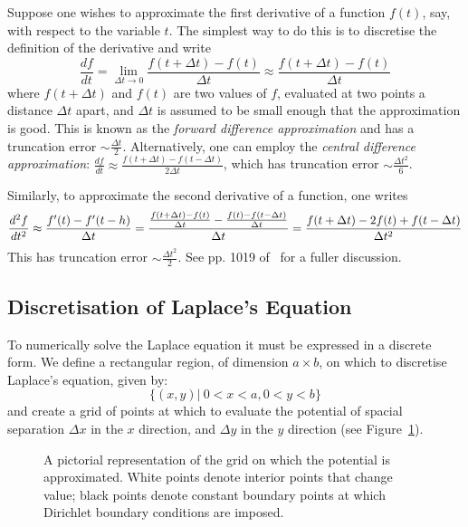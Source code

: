 \documentclass[11pt, a4paper]{article}
\newcommand{\be}{\begin{equation}}
\newcommand{\ee}{\end{equation}}
\begin{document}
Suppose one wishes to approximate the first derivative of a function $f(t)$, say,
with respect to the variable $t$. The simplest way to do this is to discretise the
definition of the derivative and write
%
\be
\frac{df}{dt} = \lim_{\Delta t \to 0} \frac{f(t+\Delta t) - f(t)}{\Delta t} \approx \frac{f(t+\Delta t) - f(t)}{\Delta t}
\ee
%
where $f(t+\Delta t)$ and $f(t)$ are two values of $f$, evaluated at two points
a distance $\Delta t$ apart, and $\Delta t$ is assumed to be small enough that
the approximation is good. This is known as the \emph{forward difference approximation}
and has a truncation error $\sim \frac{\Delta t}{2}$.
Alternatively, one can employ the \emph{central difference approximation}:
$\frac{df}{dt}\approx \frac{f(t+\Delta t) - f(t-\Delta t)}{2 \Delta t}$, which has
truncation error $\sim \frac{\Delta t^2}{6}$.

Similarly, to approximate the second derivative of a function, one writes
%
\be
\frac{d^2 f}{dt^2} \approx \frac{f'(t) - f'(t-h)}{\Delta t} \\
= \frac{\frac{f(t +\Delta t) - f(t)}{\Delta t} - \frac{f(t) - f(t -\Delta t)}{\Delta t}}{\Delta t} \\
= \frac{f(t +\Delta t) - 2f(t) + f(t-\Delta t)}{\Delta t ^2}
\ee
%
This has truncation error $\sim \frac{\Delta t^2}{2}$. See pp. 1019 of~\cite{mm} for a
fuller discussion.

\subsection{Discretisation of Laplace's Equation}

To numerically solve the Laplace equation it must be expressed in a discrete form.
We define a rectangular region, of dimension $a\times b$, on which to discretise
Laplace's equation, given by:
%
\be
\{(x,y)|\:0<x<a, 0<y<b\}
\ee
%
and create a grid of points at which to evaluate the potential of spacial separation
$\Delta x$ in the $x$ direction, and $\Delta y$ in the $y$ direction (see
Figure~\ref{fig:grid}).

\begin{figure}
\centering
{}
\caption{A pictorial representation of the grid on which the potential is approximated.
White points denote interior points that change value; black points denote constant
boundary points at which Dirichlet boundary conditions are imposed.}
\label{fig:grid}
\end{figure}
\end{document}

